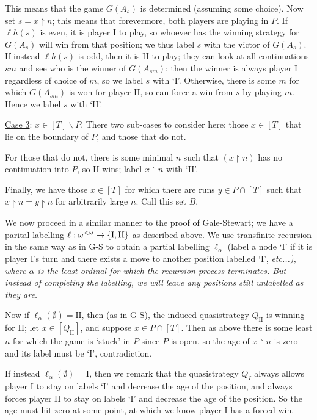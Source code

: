 \documentclass[]{article}
\newcommand{\I}{\textrm{I}}
\newcommand{\II}{\textrm{II}}
\newcommand{\om}{\omega}
\newcommand{\lom}{{<\omega}}
\newcommand{\lh}{\ell h}
\begin{document}
\begin{enumerate}[label = (\arabic*)]
    This means that the game $G(A_s)$ is determined (assuming some choice). Now set $s  = x\restriction n$; this means that forevermore, both players are playing in $P$. If $\lh(s)$ is even, it is player I to play, so whoever has the winning strategy for $G(A_s)$ will win from that position; we thus label $s$ with the victor of $G(A_s)$. If instead $\lh(s)$ is odd, then it is II to play; they can look at all continuations $sm$ and see who is the winner of $G(A_{sm})$; then the winner is always player I regardless of choice of $m$, so we label $s$ with `I'. Otherwise, there is some $m$ for which $G(A_{sm})$ is won for player II, so can force a win from $s$ by playing $m$. Hence we label $s$ with `II'.

    \underline{Case 3}: $x \in [T]\backslash P$. There two sub-cases to consider here; those $x \in [T]$ that lie on the boundary of $P$, and those that do not.

    For those that do not, there is some minimal $n$ such that $(x\restriction n)$ has no continuation into $P$, so II wins; label $x\restriction n$ with `II'.

    Finally, we have those $x \in [T]$ for which there are runs $y \in P\cap [T]$ such that $x\restriction n = y\restriction n$ for arbitrarily large $n$. Call this set $B$.

    We now proceed in a similar manner to the proof of Gale-Stewart; we have a parital labelling $\ell : \om^\lom \ra \{\I,\II\}$ as described above. We use transfinite recursion in the same way as in G-S to obtain a partial labelling $\ell_\alpha$ (label a node `I' if it is player I's turn and there exists a move to another position labelled `I', \it{etc}...), where $\alpha$ is the least ordinal for which the recursion process terminates. But instead of completing the labelling, we will leave any positions still unlabelled as they are.

    Now if $\ell_\alpha(\emptyset) = \II$, then (as in G-S), the induced quasistrategy $Q_\II$ is winning for II; let $x \in [Q_\II]$, and suppose $x \in P\cap [T]$. Then as above there is some least $n$ for which the game is `stuck' in $P$ since $P$ is open, so the age of $x\restriction n$ is zero and its label must be `I', contradiction.

    If instead $\ell_\alpha(\emptyset) = \I$, then we remark that the quasistrategy $Q_I$ always allows player I to stay on labels `I' and decrease the age of the position, and always forces player II to stay on labels `I' and decrease the age of the position. So the age must hit zero at some point, at which we know player I has a forced win.


\end{enumerate}
\end{document}
